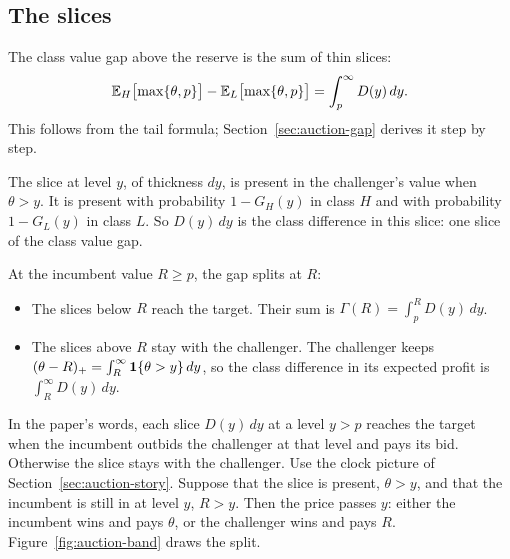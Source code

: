 \subsection*{The slices}

The class value gap above the reserve is the sum of thin slices:
\[
\mathbb{E}_H\bigl[\max\{\theta,p\}\bigr]-\mathbb{E}_L\bigl[\max\{\theta,p\}\bigr]=\int_p^\infty D(y)\,dy.
\]
This follows from the tail formula; Section~\ref{sec:auction-gap} derives it step by step.

The slice at level \(y\), of thickness \(dy\), is present in the challenger's value when \(\theta>y\). It is
present with probability \(1-G_H(y)\) in class \(H\) and with probability \(1-G_L(y)\) in class \(L\). So
\(D(y)\,dy\) is the class difference in this slice: one slice of the class value gap.

At the incumbent value \(R\ge p\), the gap splits at \(R\):
\begin{itemize}
\item The slices below \(R\) reach the target. Their sum is \(\Gamma(R)=\int_p^RD(y)\,dy\).
\item The slices above \(R\) stay with the challenger. The challenger keeps \((\theta-R)_+=\int_R^\infty\mathbf{1}\{\theta>y\}\,dy\),
so the class difference in its expected profit is \(\int_R^\infty D(y)\,dy\).
\end{itemize}
In the paper's words, each slice \(D(y)\,dy\) at a level \(y>p\) reaches the target when the incumbent outbids the
challenger at that level and pays its bid. Otherwise the slice stays with the challenger. Use the clock picture of
Section~\ref{sec:auction-story}. Suppose that the slice is present, \(\theta>y\), and that the incumbent is still
in at level \(y\), \(R>y\). Then the price passes \(y\): either the incumbent wins and pays \(\theta\), or the
challenger wins and pays \(R\). Figure~\ref{fig:auction-band}
draws the split.


